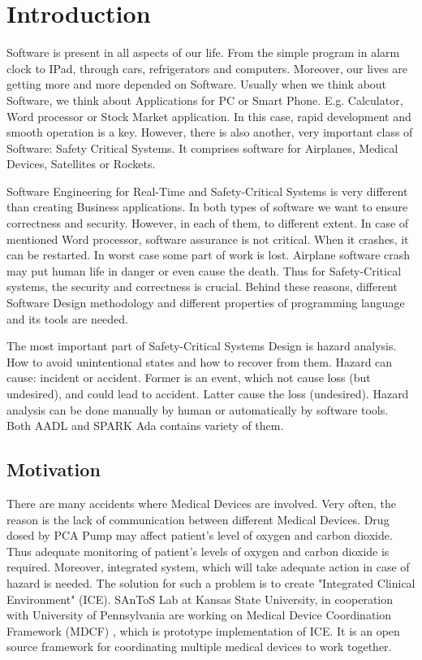 
\cleardoublepage


\chapter{Introduction}
\label{introduction}

Software is present in all aspects of our life. From the simple program in alarm clock to IPad, through cars, refrigerators and computers. Moreover, our lives are getting more and more depended on Software. Usually when we think about Software, we think about Applications for PC or Smart Phone. E.g. Calculator, Word processor or Stock Market application. In this case, rapid development and smooth operation is a key. However, there is also another, very important class of Software: Safety Critical Systems. It comprises software for Airplanes, Medical Devices, Satellites or Rockets.

Software Engineering for Real-Time and Safety-Critical Systems is very different than creating Business applications. In both types of software we want to ensure correctness and security. However, in each of them, to different extent. In case of mentioned Word processor, software assurance is not critical. When it crashes, it can be restarted. In worst case some part of work is lost. Airplane software crash may put human life in danger or even cause the death. Thus for Safety-Critical systems, the security and correctness is crucial. Behind these reasons, different Software Design methodology and different properties of programming language and its tools are needed.

The most important part of Safety-Critical Systems Design is hazard analysis. How to avoid unintentional states and how to recover from them. Hazard can cause: incident or accident. Former is an event, which not cause loss (but undesired), and could lead to accident. Latter cause the loss (undesired). Hazard analysis can be done manually by human or automatically by software tools. Both AADL and SPARK Ada contains variety of them.


\section{Motivation}
\label{introduction:motivation}
There are many accidents where Medical Devices are involved. Very often, the reason is the lack of communication between different Medical Devices. Drug dosed by PCA Pump may affect patient's level of oxygen and carbon dioxide. Thus adequate monitoring of patient's levels of oxygen and carbon dioxide is required. Moreover, integrated system, which will take adequate action in case of hazard is needed. The solution for such a problem is to create "Integrated Clinical Environment" (ICE). SAnToS Lab at Kansas State University, in cooperation with University of Pennsylvania are working on Medical Device Coordination Framework (MDCF) \cite{MedicalApplicationPlatforms:Paper}, which is prototype implementation of ICE. It is an open source framework for coordinating multiple medical devices to work together.

